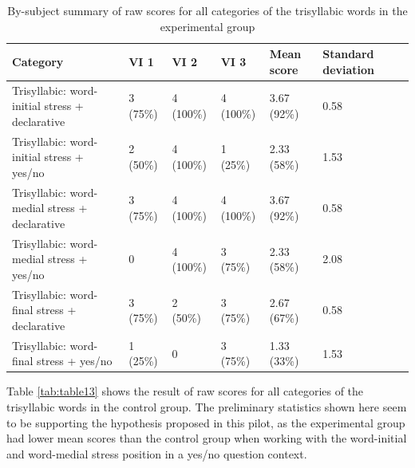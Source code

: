 \documentclass[a4paper]{article}
\begin{document}
\begin{table}[H]
  \begin{center}
    \caption{By-subject summary of raw scores for all categories of the trisyllabic words in the experimental group}
    \label{tab:table12}
      \begin{tabular}{|p{2cm}|p{2cm}|p{2cm}|p{2cm}|p{2cm}|p{2cm}|p{2cm}}
            \hline
         Category  & VI 1 & VI 2 & VI 3 & Mean score & Standard deviation  \\
        \hline
     Trisyllabic: word-initial stress + declarative & 3 (75\%)  & 4 (100\%)& 4 (100\%) & 3.67 (92\%) & 0.58 \\
      \hline
     Trisyllabic: word-initial stress + yes/no &  2 (50\%) & 4 (100\%) & 1 (25\%) & 2.33 (58\%) & 1.53\\
           \hline
     Trisyllabic: word-medial stress + declarative & 3 (75\%)  & 4 (100\%) & 4 (100\%) & 3.67 (92\%) & 0.58 \\
      \hline
     Trisyllabic: word-medial stress + yes/no & 0& 4 (100\%) & 3 (75\%) & 2.33 (58\%)  & 2.08 \\
           \hline
     Trisyllabic: word-final stress + declarative & 3 (75\%)  &  2 (50\%) & 3 (75\%) & 2.67 (67\%) & 0.58\\
      \hline
     Trisyllabic: word-final stress + yes/no & 1 (25\%) & 0 & 3 (75\%) & 1.33 (33\%) & 1.53\\
     
     \hline
    \end{tabular}
  \end{center}
\end{table}

Table \ref{tab:table13} shows the result of raw scores for all categories of the trisyllabic words in the control group. The preliminary statistics shown here seem to be supporting the hypothesis proposed in this pilot, as the experimental group had lower mean scores than the control group when working with the word-initial and word-medial stress position in a yes/no question context.
\end{document}
